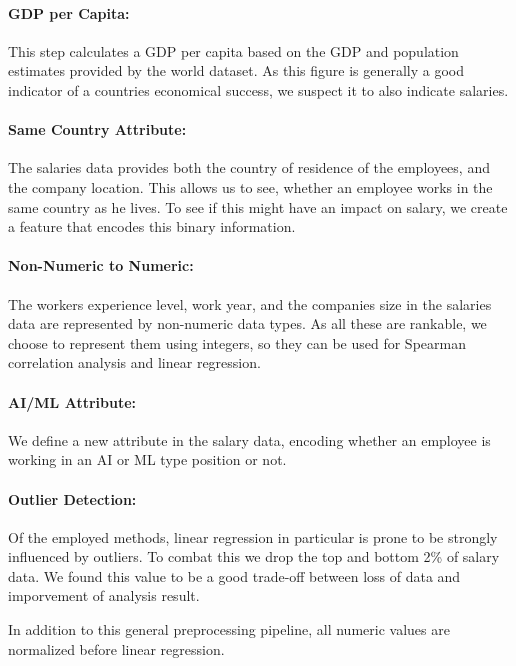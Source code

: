 \documentclass{article}
\begin{document}
\paragraph{GDP per Capita:}
This step calculates a GDP per capita based on the GDP and population estimates provided by the world dataset. As this figure is generally a good indicator of a countries economical success, we suspect it to also indicate salaries.

\paragraph{Same Country Attribute:}
The salaries data provides both the country of residence of the employees, and the company location. This allows us to see, whether an employee works in the same country as he lives. To see if this might have an impact on salary, we create a feature that encodes this binary information.

\paragraph{Non-Numeric to Numeric:}
The workers experience level, work year, and the companies size in the salaries data are represented by non-numeric data types. As all these are rankable, we choose to represent them using integers, so they can be used for Spearman correlation analysis and linear regression.

\paragraph{AI/ML Attribute:}
We define a new attribute in the salary data, encoding whether an employee is working in an AI or ML type position or not.

\paragraph{Outlier Detection:}
Of the employed methods, linear regression in particular is prone to be strongly influenced by outliers. To combat this we drop the top and bottom 2\% of salary data. We found this value to be a good trade-off between loss of data and imporvement of analysis result.

In addition to this general preprocessing pipeline, all numeric values are normalized before linear regression.

\end{document}

